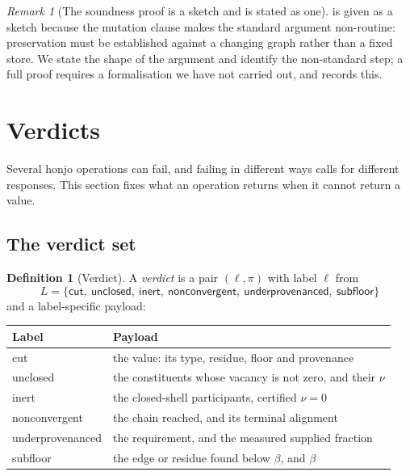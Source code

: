 \documentclass[11pt,twocolumn,a4paper]{article}
\theoremstyle{thmstyle}
\theoremstyle{definition}
\newtheorem{definition}[theorem]{Definition}
\theoremstyle{remark}
\newtheorem{remark}[theorem]{Remark}
\newcommand{\flo}{\beta}
\begin{document}
\begin{remark}[The soundness proof is a sketch and is stated as one]
\label{rem:sketch}
 is given as a sketch because the mutation clause
makes the standard argument non-routine: preservation must be established
against a changing graph rather than a fixed store. We state the shape of
the argument and identify the non-standard step; a full proof requires a
formalisation we have not carried out, and  records this.
\end{remark}

\section{Verdicts}
\label{sec:verdicts}

Several honjo operations can fail, and failing in different ways calls
for different responses. This section fixes what an operation returns
when it cannot return a value.

\subsection{The verdict set}

\begin{definition}[Verdict]
\label{def:verdict}
A \emph{verdict} is a pair $(\ell,\pi)$ with label $\ell$ from
\[
L=\{\textsf{cut},\ \textsf{unclosed},\ \textsf{inert},\
\textsf{nonconvergent},\ \textsf{underprovenanced},\
\textsf{subfloor}\}
\]
and a label-specific payload:
\begin{center}
\small
\begin{tabular}{@{}ll@{}}
\toprule
Label & Payload\\
\midrule
\textsf{cut} & the value: its type, residue, floor and provenance\\
\textsf{unclosed} & the constituents whose vacancy is not zero, and their $\nu$\\
\textsf{inert} & the closed-shell participants, certified $\nu=0$\\
\textsf{nonconvergent} & the chain reached, and its terminal alignment\\
\textsf{underprovenanced} & the requirement, and the measured supplied fraction\\
\textsf{subfloor} & the edge or residue found below $\flo$, and $\flo$\\
\bottomrule
\end{tabular}
\end{center}
\end{definition}
\end{document}
